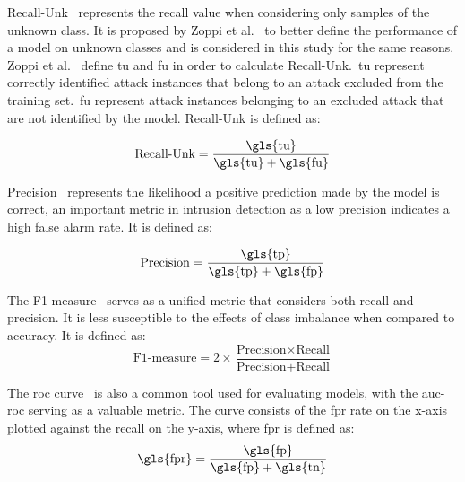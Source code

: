 Recall-Unk~\cite{Zoppi} represents the recall value when considering only
samples of the unknown class. It is proposed by Zoppi et al.~\cite{Zoppi} to
better define the performance of a model on unknown classes and is considered
in this study for the same reasons. Zoppi et al.~\cite{Zoppi} define \gls{tu}
and \gls{fu} in order to calculate Recall-Unk.\ \gls{tu} represent correctly
identified attack instances that belong to an attack excluded from the
training set.\ \gls{fu} represent attack instances belonging to an excluded attack
that are not identified by the model. Recall-Unk is defined as:

\[ \text{Recall-Unk} = \frac{\text{\gls{tu}}}{\text{\gls{tu}}+\text{\gls{fu}}} \]

Precision~\cite{metrics} represents the likelihood a positive prediction made
by the model is correct, an important metric in intrusion detection as a low
precision indicates a high false alarm rate. It is defined as:

\[ \text{Precision} = \frac{\text{\gls{tp}}}{\text{\gls{tp}}+\text{\gls{fp}}}
\]

The F1-measure~\cite{metrics} serves as a unified metric that considers both
recall and precision. It is less susceptible to the effects of class imbalance
when compared to accuracy. It is defined as:
\[ \text{F1-measure} = 2 \times \frac{\text{Precision} \times
        \text{Recall}}{\text{Precision} + \text{Recall}} \]

The \gls{roc} curve~\cite{metrics} is also a common tool used for evaluating
models, with the \gls{auc-roc} serving as a valuable metric. The curve consists
of the \gls{fpr} rate on the x-axis plotted against the recall on the y-axis,
where \gls{fpr} is defined as:
\[ \text{\gls{fpr}} = \frac{\text{\gls{fp}}}{\text{\gls{fp}} + \text{\gls{tn}}}
\]



